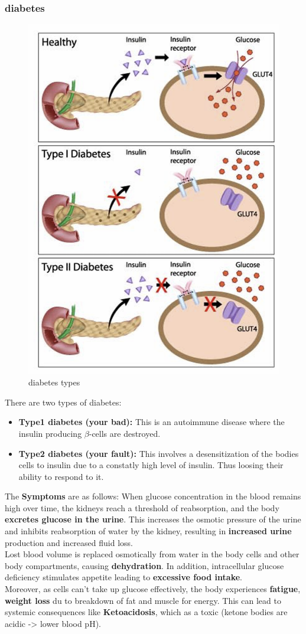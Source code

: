 \documentclass[../main.tex]{subfiles}
\begin{document}
\subsubsection{diabetes}
\begin{figure}[H]
    \centering
    \includegraphics[width=0.5\linewidth]{diabetes.png}
    \caption{diabetes types}
    \label{fig:enter-label}
\end{figure}
There are two types of diabetes:
\begin{itemize}
    \item \textbf{Type1 diabetes (your bad):} This is an autoimmune disease where the insulin producing $\beta$-cells are destroyed. 
    \item \textbf{Type2 diabetes (your fault):} This involves a desensitization of the bodies cells to insulin due to a constatly high level of insulin. Thus loosing their ability to respond to it.
\end{itemize}
The \textbf{Symptoms} are as follows: When glucose concentration in the blood remains high over time, the kidneys reach a threshold of reabsorption, and the body \textbf{excretes glucose in the urine}. This increases the osmotic pressure of the urine and inhibits reabsorption of water by the kidney, resulting in \textbf{increased urine} production and increased fluid loss.\\
\indent Lost blood volume is replaced osmotically from water in the body cells and other body compartments, causing \textbf{dehydration}. In addition, intracellular glucose deficiency stimulates appetite leading to \textbf{excessive food intake}. \\
\indent Moreover, as cells can't take up glucose effectively, the body experiences \textbf{fatigue}, \textbf{weight loss} du to breakdown of fat and muscle for energy. This can lead to systemic consequences like \textbf{Ketoacidosis}, which as a toxic (ketone bodies are acidic -> lower blood pH).   
\end{document}
